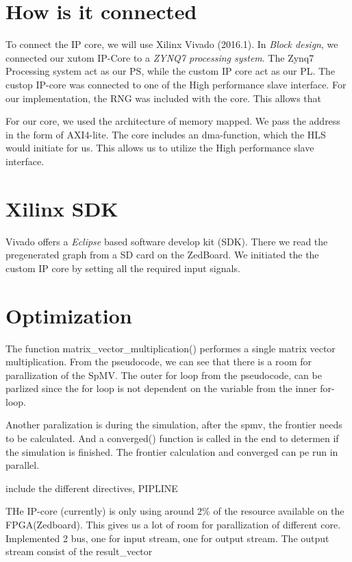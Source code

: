 \section{How is it connected}
To connect the IP core, we will use Xilinx Vivado (2016.1). In \textit{Block design}, we connected our xutom IP-Core to a 	\textit{ZYNQ7 processing system}\citep{FPGASoCManual}. The Zynq7 Processing system act as our PS, while the custom IP core act as our PL. The custop IP-core was connected to one of the High performance slave interface. For our implementation, the RNG was included with the core. This allows that 

For our core, we used the architecture of memory mapped. We pass the address in the form of AXI4-lite. The core includes an dma-function, which the HLS would initiate for us. This allows us to utilize the High performance slave interface.


\section{Xilinx SDK}
Vivado offers a \textit{Eclipse} based software develop kit (SDK). There we read the pregenerated graph from a SD card on the ZedBoard. We initiated the the custom IP core by setting all the required input signals.



\section{Optimization}
The function matrix\_vector\_multiplication() performes a single matrix vector multiplication. From the pseudocode, we can see that there is a room for parallization of the SpMV. The outer for loop from the pseudocode, can be parlized since the for loop is not dependent on the variable from the inner for-loop. 

Another paralization is during the simulation, after the spmv, the frontier needs to be calculated. And a converged() function is called in the end to determen if the simulation is finished. The frontier calculation and converged can pe run in parallel. 

include the different directives, PIPLINE

THe IP-core (currently) is only using around 2\% of the resource available on the FPGA(Zedboard). This gives us a lot of room for parallization of different core. Implemented 2 bus, one for input stream, one for output stream. The output stream consist of the result\_vector




